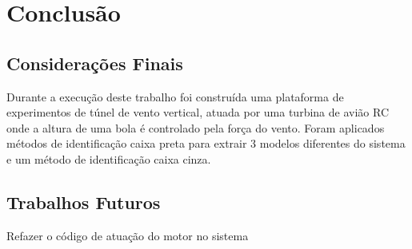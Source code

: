 \chapter{Conclusão} \label{cap7}

\section{Considerações Finais}
Durante a execução deste trabalho foi construída uma plataforma de experimentos de túnel de vento vertical, atuada por uma turbina de avião RC onde a altura de uma bola é controlado pela força do vento. Foram aplicados métodos de identificação caixa preta para extrair 3 modelos diferentes do sistema e um método de identificação caixa cinza.

\section{Trabalhos Futuros}
Refazer o código de atuação do motor no sistema


